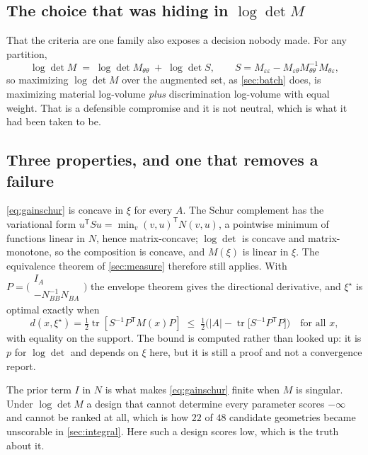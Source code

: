 \documentclass[10pt]{article}
\begin{document}
\subsection*{The choice that was hiding in \texorpdfstring{$\log\det M$}{log det M}}

That the criteria are one family also exposes a decision nobody made. For any partition,
%
\begin{equation}
\log\det M \;=\; \log\det M_{\theta\theta} \;+\; \log\det S ,
\qquad S = M_{\varepsilon\varepsilon} - M_{\varepsilon\theta}M_{\theta\theta}^{-1}M_{\theta\varepsilon},
\label{eq:schursplit}
\end{equation}
%
so maximizing $\log\det M$ over the augmented set, as \cref{sec:batch} does, is maximizing
material log-volume \emph{plus} discrimination log-volume with equal weight. That is a defensible
compromise and it is not neutral, which is what it had been taken to be.

\subsection*{Three properties, and one that removes a failure}

\eqref{eq:gainschur} is concave in $\xi$ for every $A$. The Schur complement has the variational
form $u^{\mathsf T}Su = \min_v (v,u)^{\mathsf T}N(v,u)$, a pointwise minimum of functions linear
in $N$, hence matrix-concave; $\log\det$ is concave and matrix-monotone, so the composition is
concave, and $M(\xi)$ is linear in $\xi$. The equivalence theorem of \cref{sec:measure}
therefore still applies. With $P = \big(\begin{smallmatrix} I_A \\ -N_{BB}^{-1}N_{BA}\end{smallmatrix}\big)$
the envelope theorem gives the directional derivative, and $\xi^\star$ is optimal exactly when
%
\begin{equation}
d(x,\xi^\star) = \tfrac12\operatorname{tr}\!\left[S^{-1}P^{\mathsf T}M(x)P\right]
\;\le\; \tfrac12\Big(|A| - \operatorname{tr}\big[S^{-1}P^{\mathsf T}P\big]\Big)
\quad \text{for all } x ,
\label{eq:gaincert}
\end{equation}
%
with equality on the support. The bound is computed rather than looked up: it is $p$ for
$\log\det$ and depends on $\xi$ here, but it is still a proof and not a convergence report.

The prior term $I$ in $N$ is what makes \eqref{eq:gainschur} finite when $M$ is singular. Under
$\log\det M$ a design that cannot determine every parameter scores $-\infty$ and cannot be
ranked at all, which is how $22$ of $48$ candidate geometries became unscorable in
\cref{sec:integral}. Here such a design scores low, which is the truth about it.
\end{document}

